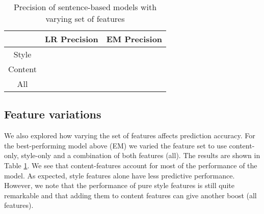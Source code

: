\begin{table}[tb]
\begin{center}
\begin{tabular}{crr}
\hline
& LR Precision & EM Precision\\ \hline
Style & & \\
Content & & \\
All & & \\ \hline
\end{tabular}
\end{center}
\caption{Precision of sentence-based models with varying set of features}
\label{table:experiments_features}
\end{table}


\subsection{Feature variations}

We also explored how varying the set of features affects prediction accuracy. For the best-performing model above (EM) we varied the feature set to use content-only, style-only and a combination of both features (all). The results are shown in Table \ref{table:experiments_features}. We see that content-features account for most of the performance of the model.
As expected, style features alone have less predictive performance. 
However, we note that the performance of pure style features is still quite remarkable and that adding them to content features can give another boost (all features). 



